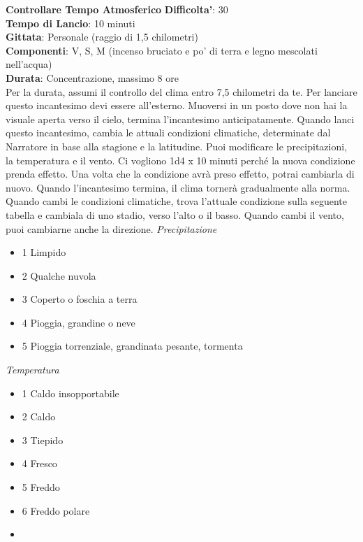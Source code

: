 \begin{multicols}{2}
\medskip\textbf{Controllare Tempo Atmosferico}
\textbf{Difficolta'}: 30\\
\textbf{Tempo di Lancio}: 10 minuti\\
\textbf{Gittata}: Personale (raggio di 1,5 chilometri)\\
\textbf{Componenti}: V, S, M (incenso bruciato e po’ di terra e legno mescolati nell’acqua)\\
\textbf{Durata}: Concentrazione, massimo 8 ore \\
Per la durata, assumi il controllo del clima entro 7,5 chilometri da te. Per lanciare questo incantesimo devi essere all’esterno. Muoversi in un posto dove non hai la visuale aperta verso il cielo, termina l’incantesimo anticipatamente. Quando lanci questo incantesimo, cambia le attuali condizioni climatiche, determinate dal Narratore in base alla stagione e la latitudine. Puoi modificare le precipitazioni, la temperatura e il vento. Ci vogliono 1d4 x 10 minuti perché la nuova condizione prenda effetto. Una volta che la condizione avrà preso effetto, potrai cambiarla di nuovo. Quando l’incantesimo termina, il clima tornerà gradualmente alla norma.\\
Quando cambi le condizioni climatiche, trova l’attuale condizione sulla seguente tabella e cambiala di uno stadio, verso l’alto o il basso. Quando cambi il vento, puoi cambiarne anche la direzione. 
\medskip
\textit{Precipitazione}
\begin{itemize}
	\item 
1 Limpido
	\item 
2 Qualche nuvola
	\item 
3 Coperto o foschia a terra
	\item 
4 Pioggia, grandine o neve
	\item 
5 Pioggia torrenziale, grandinata pesante, tormenta
\end{itemize}

\textit{Temperatura}

\begin{itemize}
 \item 
1 Caldo insopportabile
	\item 
2 Caldo
	\item 
3 Tiepido
	\item 
4 Fresco
	\item 
5 Freddo
	\item 
6 Freddo polare
	\item 
\end{itemize}


\end{multicols}
